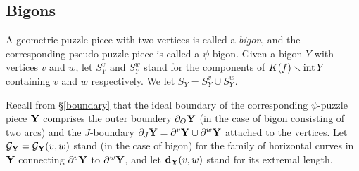 \subsection{Bigons}

 A geometric puzzle piece with two vertices is called a {\it bigon},
and the corresponding pseudo-puzzle piece is called a $\psi$-bigon. 
Given  a bigon $Y$ with vertices $v$ and $w$, 
let $S_Y^v$ and $S_Y^w$ stand for the components of $K(f)\smallsetminus \operatorname{int} Y$ containing $v$ and $w$ 
respectively.  We let $S_Y=S^v_Y\cup S^w_Y$. 


Recall from \S \ref{boundary} 
that the ideal boundary of the corresponding $\psi$-puzzle piece ${\mathbf{Y}}$ comprises the outer boundery  
$\partial_O {\mathbf{Y}}$ (in the case of bigon consisting of two arcs) and the $J$-boundary
$\partial_J{\mathbf{Y}}= \partial^v{\mathbf{Y}}\cup \partial^w{\mathbf{Y}}$ attached to the vertices. 
Let ${\mathcal G}_{\mathbf{Y}}={\mathcal G}_{\mathbf{Y}}(v,w)$ stand (in the case of bigon)                    
for the family of horizontal  curves in ${\mathbf{Y}}$ connecting $\partial^v{\mathbf{Y}}$ to $\partial^w{\mathbf{Y}}$,
and let ${\mathbf{d}}_{\mathbf{Y}}(v,w)$ stand for its extremal length.    

